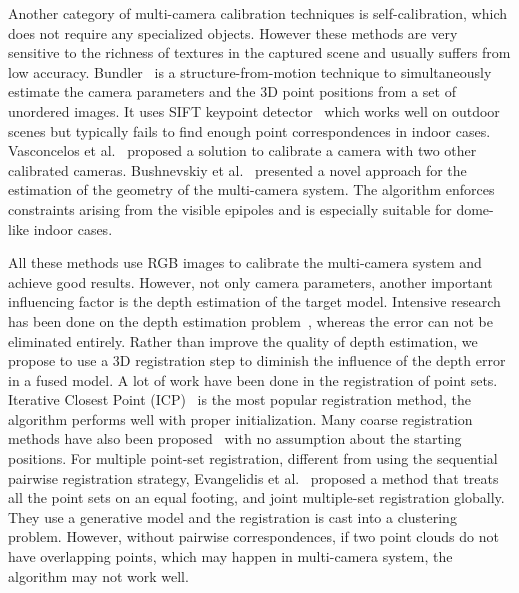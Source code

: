Another category of multi-camera calibration techniques is self-calibration, which does not require any specialized objects. 
However these methods are very sensitive to the richness of textures in the captured scene and usually suffers from low accuracy. 
%
Bundler~\cite{snavely2006photo} is a structure-from-motion technique to simultaneously estimate the camera parameters and the 3D point positions from a set of unordered images.
%
It uses SIFT keypoint detector~\cite{lowe2004distinctive} which works well on outdoor scenes but typically fails to find enough point correspondences in indoor cases.
%
Vasconcelos et al.~\cite{vasconcelos2012minimal} proposed a solution to calibrate a camera with two other calibrated cameras.
Bushnevskiy et al.~\cite{bushnevskiy2016multicamera} presented a novel approach for the estimation of the geometry of the multi-camera system. 
The algorithm enforces constraints arising from the visible epipoles and is especially suitable for dome-like indoor cases.

All these methods use RGB images to calibrate the multi-camera system and achieve good results. 
%
However, not only camera parameters, another important influencing factor is the depth estimation of the target model. 
Intensive research has been done on the depth estimation problem~\cite{scharstein,Bleyer2011PatchMatch}, whereas the error can not be eliminated entirely.
%
Rather than improve the quality of depth estimation, we propose to use a 3D registration step to diminish the influence of the depth error in a fused model.
%
A lot of work have been done in the registration of point sets. 
Iterative Closest Point (ICP)~\cite{Besl1992A} is the most popular registration method, the algorithm performs well with proper initialization.
%
Many coarse registration methods have also been proposed~\cite{Aiger:2008:CSR:1360612.1360684,5152473} with no assumption about the starting positions. 
%
For multiple point-set registration, different from using the sequential pairwise registration strategy, Evangelidis et al.~\cite{Evangelidis-ECCV-2014} proposed a method that treats all the point sets on an equal footing, and joint multiple-set registration globally. 
%
They use a generative model and the registration is cast into a clustering problem. 
However, without pairwise correspondences, if two point clouds do not have overlapping points, which may happen in multi-camera system, the algorithm may not work well.

